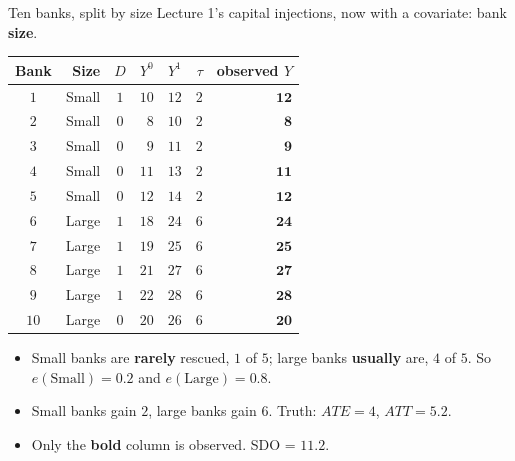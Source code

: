 \documentclass[
  11pt,
  ignorenonframetext,
  aspectratio=169,
]{beamer}
\providecommand{\tightlist}{%
  \setlength{\itemsep}{0pt}\setlength{\parskip}{0pt}}
\begin{document}
\begin{frame}{Ten banks, split by size}
\protect{}\label{ten-banks-split-by-size}
Lecture 1's capital injections, now with a covariate: bank
\textbf{size}.

\begin{center}
\scriptsize
\begin{tabular}{crcrrrr}
\toprule
Bank & Size & $D$ & $Y^0$ & $Y^1$ & $\tau$ & observed $Y$ \\
\midrule
$1$  & Small & $1$ & $10$ & $12$ & $2$ & $\mathbf{12}$ \\
$2$  & Small & $0$ & $8$  & $10$ & $2$ & $\mathbf{8}$  \\
$3$  & Small & $0$ & $9$  & $11$ & $2$ & $\mathbf{9}$  \\
$4$  & Small & $0$ & $11$ & $13$ & $2$ & $\mathbf{11}$ \\
$5$  & Small & $0$ & $12$ & $14$ & $2$ & $\mathbf{12}$ \\
\midrule
$6$  & Large & $1$ & $18$ & $24$ & $6$ & $\mathbf{24}$ \\
$7$  & Large & $1$ & $19$ & $25$ & $6$ & $\mathbf{25}$ \\
$8$  & Large & $1$ & $21$ & $27$ & $6$ & $\mathbf{27}$ \\
$9$  & Large & $1$ & $22$ & $28$ & $6$ & $\mathbf{28}$ \\
$10$ & Large & $0$ & $20$ & $26$ & $6$ & $\mathbf{20}$ \\
\bottomrule
\end{tabular}
\end{center}

\begin{itemize}
\tightlist
\item
  Small banks are \textbf{rarely} rescued, \(1\) of \(5\); large banks
  \textbf{usually} are, \(4\) of \(5\). So \(e(\text{Small}) = 0.2\) and
  \(e(\text{Large}) = 0.8\).
\item
  Small banks gain \(2\), large banks gain \(6\). Truth: \(ATE = 4\),
  \(ATT = 5.2\).
\item
  Only the \textbf{bold} column is observed. SDO = \(\mathbf{11.2}\).
\end{itemize}
\end{frame}
\end{document}

